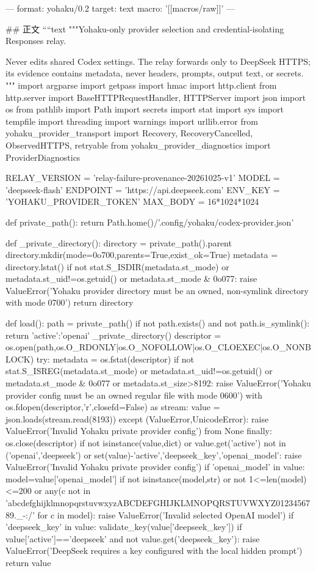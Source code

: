 ---
format: yohaku/0.2
target: text
macro: '[[macros/raw]]'
---

## 正文
````text
"""Yohaku-only provider selection and credential-isolating Responses relay.

Never edits shared Codex settings. The relay forwards only to DeepSeek HTTPS;
its evidence contains metadata, never headers, prompts, output text, or secrets.
"""
import argparse
import getpass
import hmac
import http.client
from http.server import BaseHTTPRequestHandler, HTTPServer
import json
import os
from pathlib import Path
import secrets
import stat
import sys
import tempfile
import threading
import warnings
import urllib.error
from yohaku_provider_transport import Recovery, RecoveryCancelled, ObservedHTTPS, retryable
from yohaku_provider_diagnostics import ProviderDiagnostics

RELAY_VERSION = 'relay-failure-provenance-20261025-v1'
MODEL = 'deepseek-flash'
ENDPOINT = 'https://api.deepseek.com'
ENV_KEY = 'YOHAKU_PROVIDER_TOKEN'
MAX_BODY = 16*1024*1024


def private_path():
    return Path.home()/'.config/yohaku/codex-provider.json'


def _private_directory():
    directory = private_path().parent
    directory.mkdir(mode=0o700,parents=True,exist_ok=True)
    metadata = directory.lstat()
    if not stat.S_ISDIR(metadata.st_mode) or metadata.st_uid!=os.getuid() or metadata.st_mode & 0o077:
        raise ValueError('Yohaku provider directory must be an owned, non-symlink directory with mode 0700')
    return directory


def load():
    path = private_path()
    if not path.exists() and not path.is_symlink():
        return {'active':'openai'}
    _private_directory()
    descriptor = os.open(path,os.O_RDONLY|os.O_NOFOLLOW|os.O_CLOEXEC|os.O_NONBLOCK)
    try:
        metadata = os.fstat(descriptor)
        if not stat.S_ISREG(metadata.st_mode) or metadata.st_uid!=os.getuid() or metadata.st_mode & 0o077 or metadata.st_size>8192:
            raise ValueError('Yohaku provider config must be an owned regular file with mode 0600')
        with os.fdopen(descriptor,'r',closefd=False) as stream:
            value = json.loads(stream.read(8193))
    except (ValueError,UnicodeError):
        raise ValueError('Invalid Yohaku private provider config') from None
    finally:
        os.close(descriptor)
    if not isinstance(value,dict) or value.get('active') not in ('openai','deepseek') or set(value)-{'active','deepseek_key','openai_model'}:
        raise ValueError('Invalid Yohaku private provider config')
    if 'openai_model' in value:
        model=value['openai_model']
        if not isinstance(model,str) or not 1<=len(model)<=200 or any(c not in 'abcdefghijklmnopqrstuvwxyzABCDEFGHIJKLMNOPQRSTUVWXYZ0123456789._-:/' for c in model):
            raise ValueError('Invalid selected OpenAI model')
    if 'deepseek_key' in value:
        validate_key(value['deepseek_key'])
    if value['active']=='deepseek' and not value.get('deepseek_key'):
        raise ValueError('DeepSeek requires a key configured with the local hidden prompt')
    return value


